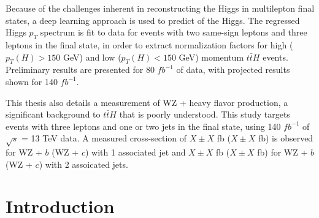 \documentclass[12pt]{report}	%
\theoremstyle{definition}
\theoremstyle{remark}
\begin{document}
\par Because of the challenges inherent in reconstructing the Higgs in multilepton final states, a deep learning approach is used to predict of the Higgs. The regressed Higgs $p_T$ spectrum is fit to data for events with two same-sign leptons and three leptons in the final state, in order to extract normalization factors for high ($p_{T}(H) > 150$ GeV) and low ($p_{T}(H) < 150$ GeV) momentum $t\bar{t}H$ events. Preliminary results are presented for 80 $fb^{-1}$ of data, with projected results shown for 140 $fb^{-1}$.

\par This thesis also details a measurement of WZ + heavy flavor production, a significant background to $t\bar{t}H$ that is poorly understood. This study targets events with three leptons and one or two jets in the final state, using 140 $fb^{-1}$ of  $\sqrt{s}$ = 13 TeV data. A measured cross-section of $X\pm X$ fb ($X\pm X$ fb) is observed for WZ + $b$ (WZ + $c$) with 1 associated jet and $X\pm X$ fb ($X\pm X$ fb) for WZ + $b$ (WZ + $c$) with 2 assoicated jets.



\tableofcontents   %

\addtolength{\oddsidemargin}{-0.3in}
\addtolength{\evensidemargin}{-0.3in}
\listoftables      %
\listoffigures     %
\addtolength{\oddsidemargin}{0.3in}
\addtolength{\evensidemargin}{0.3in}


%
%
\chapter{Introduction}
\label{part:intro}
% 
\end{document}
